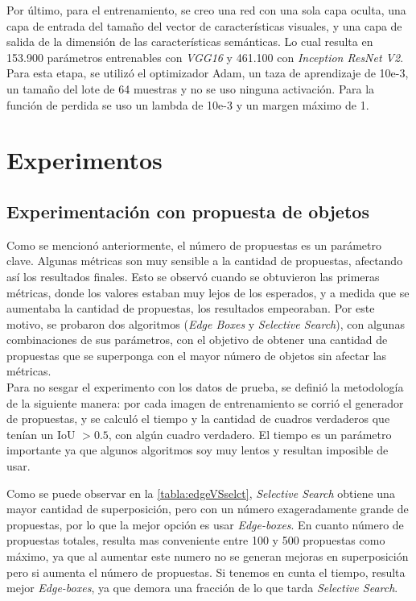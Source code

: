 Por último, para el entrenamiento, se creo una red con una sola capa oculta, una capa de entrada del tamaño del vector de características visuales, y una capa de salida de la dimensión de las características semánticas. Lo cual resulta en 153.900 parámetros entrenables con \textit{VGG16} y 461.100 con \textit{Inception ResNet V2}. Para esta etapa, se utilizó el optimizador Adam, un taza de aprendizaje de 10e-3, un tamaño del lote de 64 muestras y no se uso ninguna activación. Para la función de perdida se uso un lambda de 10e-3 y un margen máximo de 1.\\


\section{Experimentos}\label{cap:experimentos}

\subsection{Experimentación con propuesta de objetos} \label{ssec:experimentacionconpropuestadeobjetos}
Como se mencionó anteriormente, el número de propuestas es un parámetro clave. Algunas métricas son muy sensible a la cantidad de propuestas, afectando así los resultados finales. Esto se observó cuando se obtuvieron las primeras métricas, donde los valores estaban muy lejos de los esperados, y a medida que se aumentaba la cantidad de propuestas, los resultados empeoraban. Por este motivo, se probaron dos algoritmos (\textit{Edge Boxes} y \textit{Selective Search}), con algunas combinaciones de sus parámetros, con el objetivo de obtener una cantidad de propuestas que se superponga con el mayor número de objetos sin afectar las métricas.\\

Para no sesgar el experimento con los datos de prueba, se definió la metodología de la siguiente manera: por cada imagen de entrenamiento se corrió el generador de propuestas, y se calculó el tiempo y la cantidad de cuadros verdaderos que tenían un IoU $> 0.5$, con algún cuadro verdadero. El tiempo es un parámetro importante ya que algunos algoritmos soy muy lentos y resultan imposible de usar. 

Como se puede observar en la \autoref{tabla:edgeVSselct}, \textit{Selective Search} obtiene una mayor cantidad de superposición, pero con un número exageradamente grande de propuestas, por lo que la mejor opción es usar \textit{Edge-boxes}. En cuanto número de propuestas totales, resulta mas conveniente entre 100 y 500 propuestas como máximo, ya que al aumentar este numero no se generan mejoras en superposición pero si aumenta el número de propuestas. Si tenemos en cunta el tiempo, resulta mejor \textit{Edge-boxes}, ya que demora una fracción de lo que tarda \textit{Selective Search}.\\

